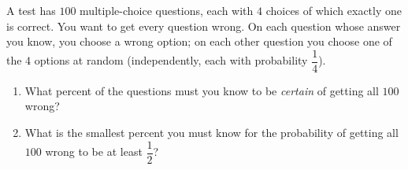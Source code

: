 A test has $100$ multiple-choice questions, each with $4$ choices of which exactly one is correct. You want to get every question wrong. On each question whose answer you know, you choose a wrong option; on each other question you choose one of the $4$ options at random (independently, each with probability $\dfrac{1}{4}$).
\begin{enumerate}
\item[(a)] What percent of the questions must you know to be \emph{certain} of getting all $100$ wrong?
\item[(b)] What is the smallest percent you must know for the probability of getting all $100$ wrong to be at least $\dfrac{1}{2}$?
\end{enumerate}
